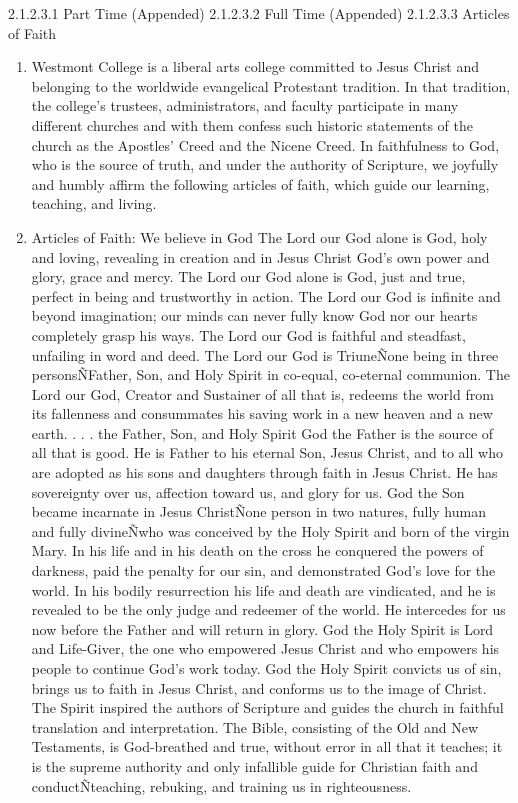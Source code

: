 \documentclass[letterpaper, 11pt]{article}
\begin{document}
				2.1.2.3.1 Part Time (Appended)
				2.1.2.3.2 Full Time (Appended)
				2.1.2.3.3 Articles of Faith
				\begin{enumerate}[label=\alph*)]
					\item{Westmont College is a liberal arts college committed to Jesus Christ and belonging to the worldwide evangelical Protestant tradition.  In that tradition, the college's trustees, administrators, and faculty participate in many different churches and with them confess such historic statements of the church as the Apostles' Creed and the Nicene Creed. In faithfulness to God, who is the source of truth, and under the authority of Scripture, we joyfully and humbly affirm the following articles of faith, which guide our learning, teaching, and living.}
					\item{Articles of Faith:}
					We believe in God
					The Lord our God alone is God, holy and loving, revealing in creation and in Jesus Christ God's own power and glory, grace and mercy. The Lord our God alone is God, just and true, perfect in being and trustworthy in action.
					The Lord our God is infinite and beyond imagination; our minds can never fully know God nor our hearts completely grasp his ways. The Lord our God is faithful and steadfast, unfailing in word and deed.
					The Lord our God is TriuneÑone being in three personsÑFather, Son, and Holy Spirit in co-equal, co-eternal communion. The Lord our God, Creator and Sustainer of all that is, redeems the world from its fallenness and consummates his saving work in a new heaven and a new earth.
					. . . the Father, Son, and Holy Spirit
					God the Father is the source of all that is good. He is Father to his eternal Son, Jesus Christ, and to all who are adopted as his sons and daughters through faith in Jesus Christ. He has sovereignty over us, affection toward us, and glory for us.
					God the Son became incarnate in Jesus ChristÑone person in two natures, fully human and fully divineÑwho was conceived by the Holy Spirit and born of the virgin Mary. In his life and in his death on the cross he conquered the powers of darkness, paid the penalty for our sin, and demonstrated God's love for the world.  In his bodily resurrection his life and death are vindicated, and he is revealed to be the only judge and redeemer of the world. He intercedes for us now before the Father and will return in glory.
					God the Holy Spirit is Lord and Life-Giver, the one who empowered Jesus Christ and who empowers his people to continue God's work today. God the Holy Spirit convicts us of sin, brings us to faith in Jesus Christ, and conforms us to the image of Christ. The Spirit inspired the authors of  Scripture and guides the church in faithful translation and interpretation. The Bible, consisting of the Old and New Testaments, is God-breathed and true, without error in all that it teaches; it is the supreme authority and only infallible guide for Christian faith and conductÑteaching, rebuking, and training us in righteousness.

\end{enumerate}
\end{document}
